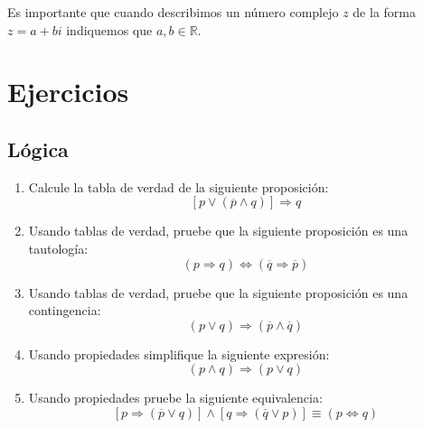 \documentclass[11pt, twoside]{memoir}
\begin{document}
\begin{note}
    Es importante que cuando describimos un número complejo \(z\) de la forma \(z=a+bi\) indiquemos que \(a,b\in\mathbb{R}\).
\end{note}

\newpage
\section{Ejercicios}
\subsection*{Lógica}
\begin{enumerate}
    \item Calcule la tabla de verdad de la siguiente proposición:
            \[\left[p\vee(\overline{p}\wedge q)\right]\Rightarrow q\]
    \item Usando tablas de verdad, pruebe que la siguiente proposición es una tautología:
        \[\left(p\Rightarrow q\right) \iff \left(\overline{q}\Rightarrow \overline{p}\right)\]
    \item Usando tablas de verdad, pruebe que la siguiente proposición es una contingencia:
        \[(p\vee q) \Rightarrow (\overline{p}\wedge \overline{q})\] 
    \item Usando propiedades simplifique la siguiente expresión:
        \[(p\wedge q)\Rightarrow (p\vee q)\]
    \item Usando propiedades pruebe la siguiente equivalencia:
        \[\left[p\Rightarrow(\overline{p}\vee q)\right]\wedge\left[q\Rightarrow(\overline{q}\vee p)\right]\equiv (p\iff q)\]
\end{enumerate}
\end{document}
